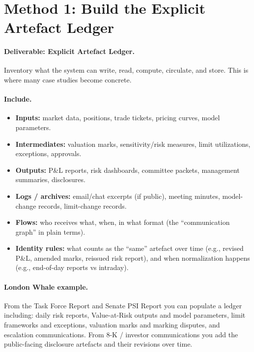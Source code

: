 \section{Method 1: Build the Explicit Artefact Ledger}
\label{sec:m1-ledger}

\paragraph{Deliverable: Explicit Artefact Ledger.}
Inventory what the system can write, read, compute, circulate, and store. This is where many case studies become concrete.

\paragraph{Include.}
\begin{itemize}
  \item \textbf{Inputs:} market data, positions, trade tickets, pricing curves, model parameters.
  \item \textbf{Intermediates:} valuation marks, sensitivity/risk measures, limit utilizations, exceptions, approvals.
  \item \textbf{Outputs:} P\&L reports, risk dashboards, committee packets, management summaries, disclosures.
  \item \textbf{Logs / archives:} email/chat excerpts (if public), meeting minutes, model-change records, limit-change records.
  \item \textbf{Flows:} who receives what, when, in what format (the “communication graph” in plain terms).
  \item \textbf{Identity rules:} what counts as the “same” artefact over time (e.g., revised P\&L, amended marks, reissued risk report),
        and when normalization happens (e.g., end-of-day reports vs intraday).
\end{itemize}

\paragraph{London Whale example.}
From the Task Force Report and Senate PSI Report you can populate a ledger including: daily risk reports,
Value-at-Risk outputs and model parameters, limit frameworks and exceptions, valuation marks and marking disputes,
and escalation communications. From 8-K / investor communications you add the public-facing disclosure artefacts
and their revisions over time.

